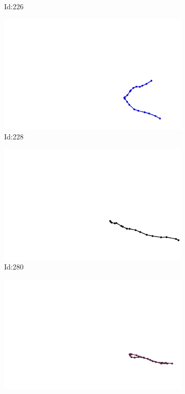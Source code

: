 \documentclass[12pt,twoside]{report}
\begin{document}
\begin{figure}
\begin{subfigure}[b]{0.20\textwidth}
\caption{Id:226}
\end{subfigure}
\begin{subfigure}[b]{0.20\textwidth}
\centering
\includegraphics[width=\textwidth]{../trajectories/228.png}
\caption{Id:228}
\end{subfigure}
\begin{subfigure}[b]{0.20\textwidth}
\centering
\includegraphics[width=\textwidth]{../trajectories/280.png}
\caption{Id:280}
\end{subfigure}
\begin{subfigure}[b]{0.20\textwidth}
\centering
\includegraphics[width=\textwidth]{../trajectories/309.png}

\end{subfigure}
\end{figure}
\end{document}
